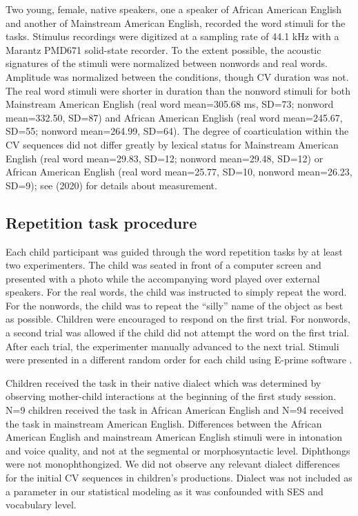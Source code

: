\documentclass[a4paper,man,natbib,donotrepeattitle, apacite]{apa6}
\begin{document}
Two young, female, native speakers, one a speaker of African American English and another of Mainstream American English, recorded the word stimuli for the tasks. Stimulus recordings were digitized at a sampling rate of 44.1 kHz with a Marantz PMD671 solid-state recorder. To the extent possible, the acoustic signatures of the stimuli were normalized between nonwords and real words. Amplitude was normalized between the conditions, though CV duration was not. The real word stimuli were shorter in duration than the nonword stimuli for both Mainstream American English (real word mean=305.68 ms, SD=73; nonword mean=332.50, SD=87) and African American English (real word mean=245.67, SD=55; nonword mean=264.99, SD=64). The degree of coarticulation within the CV sequences did not differ greatly by lexical status for Mainstream American English (real word mean=29.83, SD=12; nonword mean=29.48, SD=12) or African American English (real word mean=25.77, SD=10, nonword mean=26.23, SD=9); see \citeauthor{cychoszLexicalAdvantageFouryearold2020} (2020) for details about measurement.   

\subsection{Repetition task procedure}

Each child participant was guided through the word repetition tasks by at least two experimenters. The child was seated in front of a computer screen and presented with a photo while the accompanying word played over external speakers. For the real words, the child was instructed to simply repeat the word. For the nonwords, the child was to repeat the ``silly'' name of the object as best as possible. Children were encouraged to respond on the first trial. For nonwords, a second trial was allowed if the child did not attempt the word on the first trial. After each trial, the experimenter manually advanced to the next trial. Stimuli were presented in a different random order for each child using E-prime software \cite{schneiderEPrime2012}. 

Children received the task in their native dialect which was determined by observing mother-child interactions at the beginning of the first study session. N=9 children received the task in African American English and N=94 received the task in mainstream American English. Differences between the African American English and mainstream American English stimuli were in intonation and voice quality, and not at the segmental or morphosyntactic level. Diphthongs were not monophthongized. We did not observe any relevant dialect differences for the initial CV sequences in children’s productions. Dialect was not included as a parameter in our statistical modeling as it was confounded with SES and vocabulary level.
\end{document}
